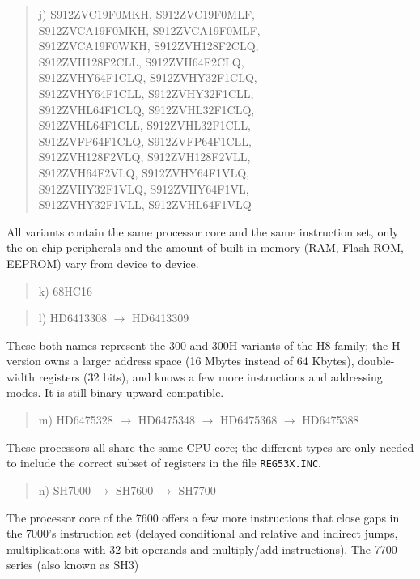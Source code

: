 \documentclass[12pt,twoside]{report}
\newcommand{\tty}[1]{{\tt #1}}
\begin{document}
\begin{quote}
j) S912ZVC19F0MKH, S912ZVC19F0MLF,\\
   S912ZVCA19F0MKH, S912ZVCA19F0MLF,\\
   S912ZVCA19F0WKH, S912ZVH128F2CLQ,\\
   S912ZVH128F2CLL, S912ZVH64F2CLQ,\\
   S912ZVHY64F1CLQ, S912ZVHY32F1CLQ,\\
   S912ZVHY64F1CLL, S912ZVHY32F1CLL,\\
   S912ZVHL64F1CLQ, S912ZVHL32F1CLQ,\\
   S912ZVHL64F1CLL, S912ZVHL32F1CLL,\\
   S912ZVFP64F1CLQ, S912ZVFP64F1CLL,\\
   S912ZVH128F2VLQ, S912ZVH128F2VLL,\\
   S912ZVH64F2VLQ, S912ZVHY64F1VLQ,\\
   S912ZVHY32F1VLQ, S912ZVHY64F1VL,\\
   S912ZVHY32F1VLL, S912ZVHL64F1VLQ 
\end{quote}
All variants contain the same processor core and the same
instruction set, only the on-chip peripherals and the
amount of built-in memory (RAM, Flash-ROM, EEPROM)
vary from device to device.
\begin{quote}
k) 68HC16
\end{quote}
\begin{quote}
l) HD6413308 $\rightarrow$ HD6413309
\end{quote}
These both names represent the 300 and 300H variants of the H8
family; the H version owns a larger address space (16 Mbytes instead
of 64 Kbytes), double-width registers (32 bits), and knows a few more
instructions and addressing modes.  It is still binary upward
compatible.
\begin{quote}
m) HD6475328 $\rightarrow$ HD6475348 $\rightarrow$ HD6475368 $\rightarrow$ HD6475388
\end{quote}
These processors all share the same CPU core; the different types are
only needed to include the correct subset of registers in the file
\tty{REG53X.INC}.
\begin{quote}
n) SH7000 $\rightarrow$ SH7600 $\longrightarrow$ SH7700
\end{quote}
The processor core of the 7600 offers a few more instructions that
close gaps in the 7000's instruction set (delayed conditional and
relative and indirect jumps, multiplications with 32-bit operands and
multiply/add instructions).  The 7700 series (also known as SH3)
\end{document}
